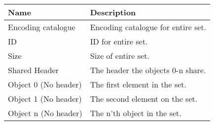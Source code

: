 \documentclass[11pt]{article}
\begin{document}
\begin{center}
  \begin{tabular}{ |l|l| }
    \hline
    \textbf{Name}        & \textbf{Description}               \\
    \hline
    Encoding catalogue   & Encoding catalogue for entire set. \\
    ID                   & ID for entire set.                 \\
    Size                 & Size of entire set.                \\
    Shared Header        & The header the objects 0-n share.  \\
    Object 0 (No header) & The first element in the set.      \\
    Object 1 (No header) & The second element on the set.     \\
    Object n (No header) & The n'th object in the set.        \\
    \hline
  \end{tabular}
\end{center}

\end{document}
